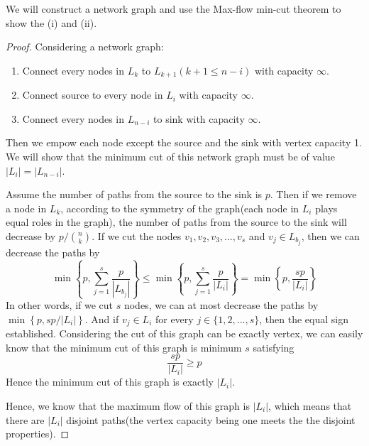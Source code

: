 We will construct a network graph and use the Max-flow min-cut theorem to show the (i) and (ii).
\begin{proof}
  Considering a network graph:
  \begin{enumerate}
    \item Connect every nodes in $L_k$ to $L_{k + 1}(k + 1 \leq n - i)$ with capacity $\infty$.
    \item Connect source to every node in $L_i$ with capacity $\infty$.
    \item Connect every nodes in $L_{n - i}$ to sink with capacity $\infty$.
  \end{enumerate}
  Then we empow each node except the source and the sink with \textsf{vertex capacity} 1. We will show that the minimum cut of this network graph must be of value $|L_i| = |L_{n - i}|$.

  Assume the number of paths from the source to the sink is $p$. Then if we remove a node in $L_k$, according to the symmetry of the graph(each node in $L_i$ plays equal roles in the graph), the number of paths from the source to the sink will decrease by $p / \binom{n}{k}$. If we cut the nodes $v_1, v_2, v_3, ..., v_s$ and $v_j \in L_{b_j}$, then we can decrease the paths by
  \[\min\left\{p, \sum_{j = 1}^{s} \dfrac{p}{|L_{b_j}|}\right\} \leq \min\left\{p, \sum_{j = 1}^s \dfrac{p}{|L_i|}\right\} = \min\left\{p, \dfrac{sp}{|L_i|}\right\}\]
  In other words, if we cut $s$ nodes, we can at most decrease the paths by $\min\left\{p, sp/|L_i|\right\}$. And if $v_j \in L_i$ for every $j \in \{1, 2, ..., s\}$, then the equal sign established. Considering the cut of this graph can be exactly vertex, we can easily know that the minimum cut of this graph is minimum $s$ satisfying
  \[\dfrac{sp}{|L_i|} \geq p\]
  Hence the minimum cut of this graph is exactly $|L_i|$.

  Hence, we know that the maximum flow of this graph is $|L_i|$, which means that there are $|L_i|$ disjoint paths(the vertex capacity being one meets the the disjoint properties).
\end{proof}
